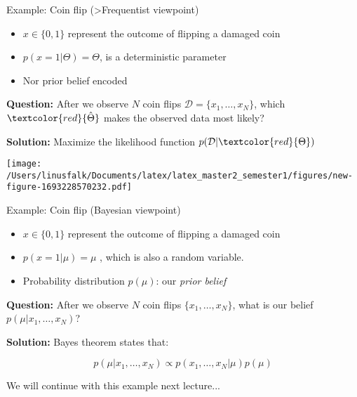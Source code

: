 
\begin{example}{Example: Coin flip (>Frequentist viewpoint)}
    \begin{itemize}
        \item $x \in \{ 0,1\}$ represent the outcome of flipping a damaged coin 
        \item $p(x=1 | \Theta) = \Theta$, is a deterministic parameter 
        \item Nor prior belief encoded 
    \end{itemize}
    
    \vspace{2em}
    
    \textbf{Question:} After we observe $N$ coin flips $\mathcal{D} = \{x_1, \dots, x_N\}$, which $\textcolor{red}{\hat{\Theta}}$ makes the observed data most likely?
    
    \textbf{Solution:} Maximize the likelihood function $p(\mathcal{D}|\textcolor{red}{\Theta})$
    
    \texttt{[image: /Users/linusfalk/Documents/latex/latex\_master2\_semester1/figures/new-figure-1693228570232.pdf]}
  
    
    \end{example}

\begin{example}{Example: Coin flip (Bayesian viewpoint)}
\begin{itemize}
    \item $x \in \{ 0,1\}$ represent the outcome of flipping a damaged coin 
    \item $p(x=1 | \mu) = \mu$ , which is also a random variable. 
    \item Probability distribution $p(\mu)$: our \emph{prior belief} 
\end{itemize}

\vspace{2em}

\textbf{Question:} After we observe $N$ coin flips $\{ x_1, \dots, x_N\}$, what is our belief $p(\mu | x_1, \dots, x_N)$?

\textbf{Solution:} Bayes theorem states that:

\begin{equation}
    p(\mu | x_1, \dots, x_N) \propto p(x_1, \dots, x_N | \mu)p(\mu) 
\end{equation}

We will continue with this example next lecture... 

\end{example}


